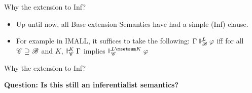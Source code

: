 \documentclass{beamer}
\begin{document}
\begin{frame}{Why the extension to Inf?}
	\begin{itemize}
		\item Up until now, all Base-extension Semantics have had a simple (Inf) clause. 
		\vspace{5pt}
		\item For example in IMALL, it suffices to take the following:\newline
		$\Gamma\Vdash_{ \!\!\mathscr{B} }^{ \!\!L }\varphi$ iff for all $\mathscr{C} \supseteq \mathscr{B}$ and $K$, $\Vdash_{ \!\!\mathscr{C} }^{ \!\!K }\Gamma$ implies $\suppM{\baseC}{L\msetsum K}\varphi$
	\end{itemize}
\end{frame}
\begin{frame}{Why the extension to Inf?}
	\begin{center}
		\textbf{Question: Is this still an inferentialist semantics?}
	\end{center}
\end{frame}
\end{document}
